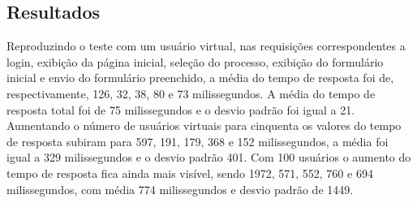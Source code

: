\documentclass[12pt]{article}
\begin{document}
\subsection{Resultados}



Reproduzindo o teste com um usuário virtual, nas requisições correspondentes a login, exibição da página inicial, seleção do processo, exibição do formulário inicial e envio do formulário preenchido, a média do tempo de resposta foi de, respectivamente, 126, 32, 38, 80 e 73 milissegundos. A média do tempo de resposta total foi de 75 milissegundos e o desvio padrão foi igual a 21.  Aumentando o número de usuários virtuais para cinquenta os valores do tempo de resposta subiram para 597, 191, 179, 368 e 152 milissegundos, a média foi igual a 329 milissegundos e o desvio padrão 401. Com 100 usuários o aumento do tempo de resposta fica ainda mais visível, sendo 1972, 571, 552, 760 e 694 milissegundos, com média 774 milissegundos e desvio padrão de 1449.
\end{document}
